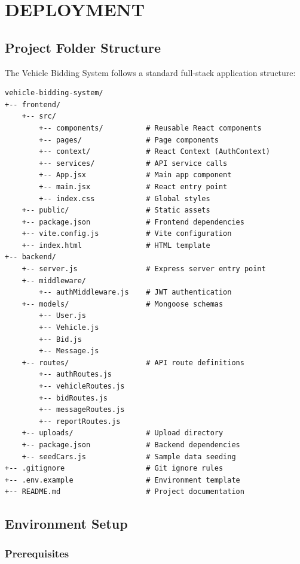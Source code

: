 \chapter{DEPLOYMENT}

\section{Project Folder Structure}

The Vehicle Bidding System follows a standard full-stack application structure:

\begin{verbatim}
vehicle-bidding-system/
+-- frontend/
    +-- src/
        +-- components/          # Reusable React components
        +-- pages/               # Page components
        +-- context/             # React Context (AuthContext)
        +-- services/            # API service calls
        +-- App.jsx              # Main app component
        +-- main.jsx             # React entry point
        +-- index.css            # Global styles
    +-- public/                  # Static assets
    +-- package.json             # Frontend dependencies
    +-- vite.config.js           # Vite configuration
    +-- index.html               # HTML template
+-- backend/
    +-- server.js                # Express server entry point
    +-- middleware/
        +-- authMiddleware.js    # JWT authentication
    +-- models/                  # Mongoose schemas
        +-- User.js
        +-- Vehicle.js
        +-- Bid.js
        +-- Message.js
    +-- routes/                  # API route definitions
        +-- authRoutes.js
        +-- vehicleRoutes.js
        +-- bidRoutes.js
        +-- messageRoutes.js
        +-- reportRoutes.js
    +-- uploads/                 # Upload directory
    +-- package.json             # Backend dependencies
    +-- seedCars.js              # Sample data seeding
+-- .gitignore                   # Git ignore rules
+-- .env.example                 # Environment template
+-- README.md                    # Project documentation
\end{verbatim}

\section{Environment Setup}

\subsection{Prerequisites}

